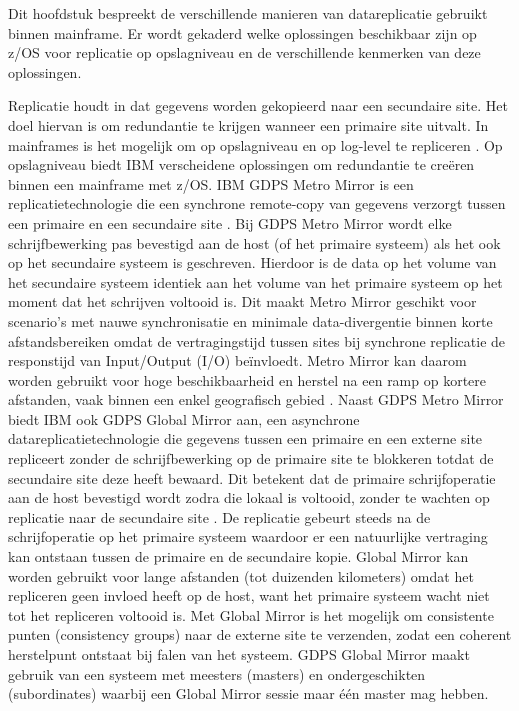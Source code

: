 Dit hoofdstuk bespreekt de verschillende manieren van datareplicatie gebruikt binnen mainframe.
Er wordt gekaderd welke oplossingen beschikbaar zijn op z/OS voor replicatie op opslagniveau en de verschillende kenmerken van deze oplossingen.

Replicatie houdt in dat gegevens worden gekopieerd naar een secundaire site. 
Het doel hiervan is om redundantie te krijgen wanneer een primaire site uitvalt.
In mainframes is het mogelijk om op opslagniveau en op log-level te repliceren \autocite{bourbonnais2015}.
Op opslagniveau biedt IBM verscheidene oplossingen om redundantie te creëren binnen een mainframe met z/OS\@.
IBM GDPS Metro Mirror is een replicatietechnologie die een synchrone remote-copy van gegevens verzorgt tussen een primaire en een secundaire site \autocite{gomes_2025_redbooks}.
Bij GDPS Metro Mirror wordt elke schrijfbewerking pas bevestigd aan de host (of het primaire systeem) als het ook op het secundaire systeem is geschreven.
Hierdoor is de data op het volume van het secundaire systeem identiek aan het volume van het primaire systeem op het moment dat het schrijven voltooid is.
Dit maakt Metro Mirror geschikt voor scenario's met nauwe synchronisatie en minimale data-divergentie binnen korte afstandsbereiken omdat de vertragingstijd tussen sites bij synchrone replicatie de responstijd van Input/Output (I/O) beïnvloedt.
Metro Mirror kan daarom worden gebruikt voor hoge beschikbaarheid en herstel na een ramp op kortere afstanden, vaak binnen een enkel geografisch gebied \autocite{ibm_2017_metro}.
Naast GDPS Metro Mirror biedt IBM ook GDPS Global Mirror aan, een asynchrone datareplicatietechnologie die gegevens tussen een primaire en een externe site repliceert zonder de schrijfbewerking op de primaire site te blokkeren totdat de secundaire site deze heeft bewaard.
Dit betekent dat de primaire schrijfoperatie aan de host bevestigd wordt zodra die lokaal is voltooid, zonder te wachten op replicatie naar de secundaire site \autocite{ibm_2021_global}.
De replicatie gebeurt steeds na de schrijfoperatie op het primaire systeem waardoor er een natuurlijke vertraging kan ontstaan tussen de primaire en de secundaire kopie.
Global Mirror kan worden gebruikt voor lange afstanden (tot duizenden kilometers) omdat het repliceren geen invloed heeft op de host, want het primaire systeem wacht niet tot het repliceren voltooid is.
Met Global Mirror is het mogelijk om consistente punten (consistency groups) naar de externe site te verzenden, zodat een coherent herstelpunt ontstaat bij falen van het systeem.
GDPS Global Mirror maakt gebruik van een systeem met meesters (masters) en ondergeschikten (subordinates) waarbij een Global Mirror sessie maar één master mag hebben.

